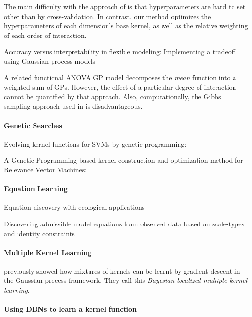\documentclass[twoside]{article}
\begin{document}
The main difficulty with the approach of \cite{DBLP:journals/corr/abs-0909-0844} is that hyperparameters are hard to set other than by cross-validation.  In contrast, our method optimizes the hyperparameters of each dimension's base kernel, as well as the relative weighting of each order of interaction. 

Accuracy versus interpretability in flexible modeling: Implementing a tradeoff using Gaussian process models \cite{plate1999accuracy}

A related functional ANOVA GP model\cite{kaufman2010bayesian} decomposes the \emph{mean} function into a weighted sum of GPs. However, the effect of a particular degree of interaction cannot be quantified by that approach. Also, computationally, the Gibbs sampling approach used in \cite{kaufman2010bayesian} is disadvantageous.

\paragraph{Genetic Searches}

Evolving kernel functions for SVMs by genetic programming: \cite{diosan2007evolving}

A Genetic Programming based kernel construction and optimization method for Relevance Vector Machines: \cite{bing2010gp}

\paragraph{Equation Learning}

Equation discovery with ecological applications \cite{dzeroski1999equation}

Discovering admissible model equations from observed data based on scale-types and identity constraints \cite{washio1999discovering}

\paragraph{Multiple Kernel Learning}

\cite{christoudias2009bayesian} previously showed how mixtures of kernels can be learnt by gradient descent in the Gaussian process framework.  They call this \emph{Bayesian localized multiple kernel learning}.

\paragraph{Using DBNs to learn a kernel function}
\end{document}
